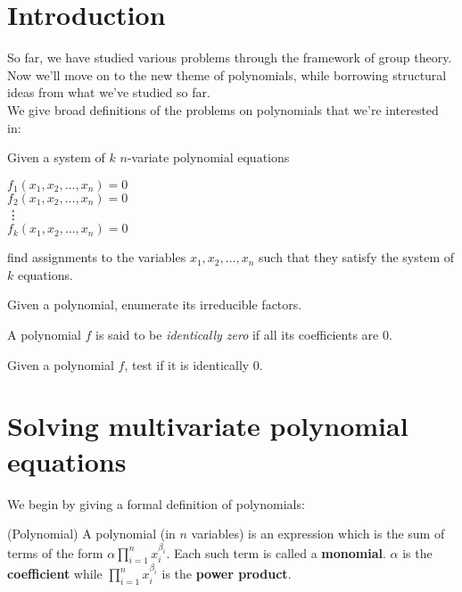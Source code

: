 
\section{Introduction}
So far, we have studied various problems through the framework of group theory. Now we'll move on to the new theme of polynomials, while borrowing structural ideas from what we've studied so far.\\
We give broad definitions of the problems on polynomials that we're interested in:\\

\begin{problem}
Given a system of $k$ $n$-variate polynomial equations
\begin{center}
$f_1(x_1, x_2, \ldots, x_n) = 0$\\
$f_2(x_1, x_2, \ldots, x_n) = 0$\\
\hspace{20 mm}\vdots \\
$f_k (x_1, x_2, \ldots, x_n) = 0$
\end{center}
find assignments to the variables $x_1, x_2, \ldots, x_n$ such that they satisfy the system of $k$ equations.
\end{problem}

\begin{problem}
Given a polynomial, enumerate its irreducible factors.
\end{problem}

A polynomial $f$ is said to be {\em identically zero} if all its coefficients are 0. 

\begin{problem}
Given a polynomial $f$, test if it is identically 0.
\end{problem}

\section{Solving multivariate polynomial equations}
We begin by giving a formal definition of polynomials:
\begin{definition} (Polynomial)
A polynomial (in $n$ variables) is an expression which is the sum of terms of the form $ \alpha\prod\limits_{i=1}^{n} x_i^{\beta_i}$. Each such term is called a \textbf{monomial}. $\alpha$ is the \textbf{coefficient} while $\prod\limits_{i=1}^{n} x_i^{\beta_i}$ is the \textbf{power product}.
\end{definition}


